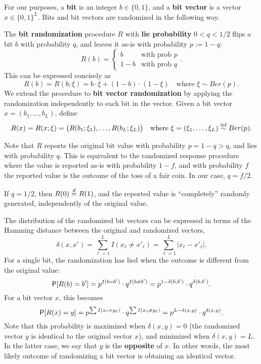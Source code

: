 \documentclass[11pt,draft]{article}
\begin{document}
For our purposes, a \textbf{bit} is an integer $b \in \{0,1\}$, and a \textbf{bit vector} is a vector $x \in \{0,1\}^L$.
Bits and bit vectors are randomized in the following way.

\begin{defn}
The \textbf{bit randomization} procedure $R$ with \textbf{lie probability} $0 < q < 1/2$ flips a bit $b$ with probability $q$, and leaves it as-is with probability $p := 1-q$:
\[ R(b) =
\begin{cases}
b & \text{with prob }p \\
1-b & \text{with prob }q
\end{cases}.
\]
This can be expressed concisely as
\[ R(b) = R(b; \xi) = b \cdot \xi + (1-b) \cdot (1-\xi)
\quad\text{where } \xi\sim Ber(p). \]
We extend the procedure to \textbf{bit vector randomization} by applying the randomization independently to each bit in the vector.
Given a bit vector $x = (b_1,\dots,b_L)$, define
\begin{equation}\label{eq:bitvecrand}
R(x) = R(x;\xi) = \big(R(b_1;\xi_1), \dots, R(b_L;\xi_L)\big)
\quad\text{where } \xi = (\xi_1,\dots,\xi_L) \iid Ber(p).
\end{equation}
\end{defn}

\begin{rmk}
Note that $R$ reports the original bit value with probability $p = 1-q > q$, and lies with probability $q$.
This is equivalent to the randomized response procedure where the value is reported as-is with probability $1-f$, and with probability $f$ the reported value is the outcome of the toss of a fair coin.
In our case, $q = f/2$.
\end{rmk}
\begin{rmk}
If $q = 1/2$, then $R(0)\eqdist R(1)$, and the reported value is ``completely'' randomly generated, \ie independently of the original value.
\end{rmk}


The distribution of the randomized bit vectors can be expressed in terms of
the Hamming distance between the original and randomized vectors,
\[ \delta(x,x') = \sum_{\ell = 1}^L I(x_\ell \neq x'_\ell)
= \sum_{\ell = 1}^L |x_\ell - x'_\ell|. \]
For a single bit, the randomization has lied when the outcome is different from the original value: 
\[ \P[R(b) = b'] = p^{I(b = b')}\cdot q^{I(b \neq b')}
= p^{1 - \delta(b,b')}\cdot q^{\delta(b,b')}. \]
For a bit vector $x$, this becomes
\[ \P[R(x) = y] = p^{\sum I(x_\ell = y_\ell)}\cdot 
q^{\sum I(x_\ell \neq y_\ell)}
= p^{L-\delta(x,y)}\cdot q^{\delta(x,y)}. \]
Note that this probability is maximized when $\delta(x,y) = 0$ (the randomized vector $y$ is identical to the original vector $x$), and minimized when $\delta(x,y) = L$.
In the latter case, we say that $y$ is the \textbf{opposite} of $x$.
In other words, the most likely outcome of randomizing a bit vector is obtaining an identical vector.
\end{document}
